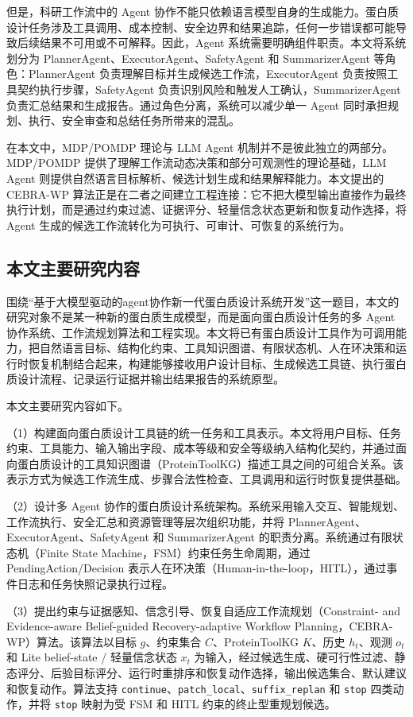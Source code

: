 但是，科研工作流中的 Agent
协作不能只依赖语言模型自身的生成能力。蛋白质设计任务涉及工具调用、成本控制、安全边界和结果追踪，任何一步错误都可能导致后续结果不可用或不可解释。因此，Agent
系统需要明确组件职责。本文将系统划分为
PlannerAgent、ExecutorAgent、SafetyAgent 和 SummarizerAgent
等角色：PlannerAgent 负责理解目标并生成候选工作流，ExecutorAgent
负责按照工具契约执行步骤，SafetyAgent
负责识别风险和触发人工确认，SummarizerAgent
负责汇总结果和生成报告。通过角色分离，系统可以减少单一 Agent
同时承担规划、执行、安全审查和总结任务所带来的混乱。

在本文中，MDP/POMDP 理论与 LLM Agent
机制并不是彼此独立的两部分。MDP/POMDP
提供了理解工作流动态决策和部分可观测性的理论基础，LLM Agent
则提供自然语言目标解析、候选计划生成和结果解释能力。本文提出的 CEBRA-WP
算法正是在二者之间建立工程连接：它不把大模型输出直接作为最终执行计划，而是通过约束过滤、证据评分、轻量信念状态更新和恢复动作选择，将
Agent 生成的候选工作流转化为可执行、可审计、可恢复的系统行为。

\subsection{本文主要研究内容}\label{ux672cux6587ux4e3bux8981ux7814ux7a76ux5185ux5bb9}

围绕``基于大模型驱动的agent协作新一代蛋白质设计系统开发''这一题目，本文的研究对象不是某一种新的蛋白质生成模型，而是面向蛋白质设计任务的多
Agent
协作系统、工作流规划算法和工程实现。本文将已有蛋白质设计工具作为可调用能力，把自然语言目标、结构化约束、工具知识图谱、有限状态机、人在环决策和运行时恢复机制结合起来，构建能够接收用户设计目标、生成候选工具链、执行蛋白质设计流程、记录运行证据并输出结果报告的系统原型。

本文主要研究内容如下。

（1）构建面向蛋白质设计工具链的统一任务和工具表示。本文将用户目标、任务约束、工具能力、输入输出字段、成本等级和安全等级纳入结构化契约，并通过面向蛋白质设计的工具知识图谱（ProteinToolKG）描述工具之间的可组合关系。该表示方式为候选工作流生成、步骤合法性检查、工具调用和运行时恢复提供基础。

（2）设计多 Agent
协作的蛋白质设计系统架构。系统采用输入交互、智能规划、工作流执行、安全汇总和资源管理等层次组织功能，并将
PlannerAgent、ExecutorAgent、SafetyAgent 和 SummarizerAgent
的职责分离。系统通过有限状态机（Finite State
Machine，FSM）约束任务生命周期，通过 PendingAction/Decision
表示人在环决策（Human-in-the-loop，HITL），通过事件日志和任务快照记录执行过程。

（3）提出约束与证据感知、信念引导、恢复自适应工作流规划（Constraint- and
Evidence-aware Belief-guided Recovery-adaptive Workflow
Planning，CEBRA-WP）算法。该算法以目标 $g$、约束集合
$C$、ProteinToolKG $K$、历史 $h_t$、观测
$o_t$ 和 Lite belief-state / 轻量信念状态 $x_t$
为输入，经过候选生成、硬可行性过滤、静态评分、后验目标评分、运行时重排序和恢复动作选择，输出候选集合、默认建议和恢复动作。算法支持
\texttt{continue}、\texttt{patch\_local}、\texttt{suffix\_replan} 和
\texttt{stop} 四类动作，并将 \texttt{stop} 映射为受 FSM 和 HITL
约束的终止型重规划候选。


